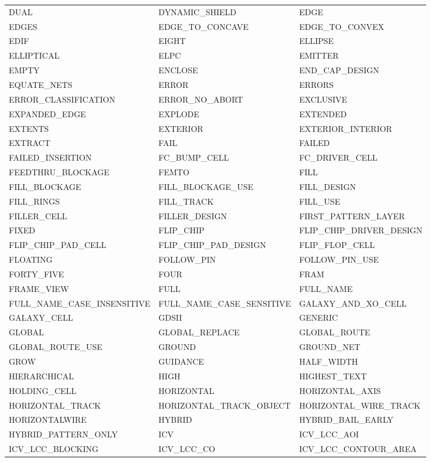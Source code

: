 \begin{longtable}{@{}>{\raggedright\arraybackslash\ttfamily}p{} >{\raggedright\arraybackslash\ttfamily}p{} >{\raggedright\arraybackslash\ttfamily}p{}@{}}
DUAL & DYNAMIC\_SHIELD & EDGE \\
EDGES & EDGE\_TO\_CONCAVE & EDGE\_TO\_CONVEX \\
EDIF & EIGHT & ELLIPSE \\
ELLIPTICAL & ELPC & EMITTER \\
EMPTY & ENCLOSE & END\_CAP\_DESIGN \\
EQUATE\_NETS & ERROR & ERRORS \\
ERROR\_CLASSIFICATION & ERROR\_NO\_ABORT & EXCLUSIVE \\
EXPANDED\_EDGE & EXPLODE & EXTENDED \\
EXTENTS & EXTERIOR & EXTERIOR\_INTERIOR \\
EXTRACT & FAIL & FAILED \\
FAILED\_INSERTION & FC\_BUMP\_CELL & FC\_DRIVER\_CELL \\
FEEDTHRU\_BLOCKAGE & FEMTO & FILL \\
FILL\_BLOCKAGE & FILL\_BLOCKAGE\_USE & FILL\_DESIGN \\
FILL\_RINGS & FILL\_TRACK & FILL\_USE \\
FILLER\_CELL & FILLER\_DESIGN & FIRST\_PATTERN\_LAYER \\
FIXED & FLIP\_CHIP & FLIP\_CHIP\_DRIVER\_DESIGN \\
FLIP\_CHIP\_PAD\_CELL & FLIP\_CHIP\_PAD\_DESIGN & FLIP\_FLOP\_CELL \\
FLOATING & FOLLOW\_PIN & FOLLOW\_PIN\_USE \\
FORTY\_FIVE & FOUR & FRAM \\
FRAME\_VIEW & FULL & FULL\_NAME \\
FULL\_NAME\_CASE\_INSENSITIVE & FULL\_NAME\_CASE\_SENSITIVE & GALAXY\_AND\_XO\_CELL \\
GALAXY\_CELL & GDSII & GENERIC \\
GLOBAL & GLOBAL\_REPLACE & GLOBAL\_ROUTE \\
GLOBAL\_ROUTE\_USE & GROUND & GROUND\_NET \\
GROW & GUIDANCE & HALF\_WIDTH \\
HIERARCHICAL & HIGH & HIGHEST\_TEXT \\
HOLDING\_CELL & HORIZONTAL & HORIZONTAL\_AXIS \\
HORIZONTAL\_TRACK & HORIZONTAL\_TRACK\_OBJECT & HORIZONTAL\_WIRE\_TRACK \\
HORIZONTALWIRE & HYBRID & HYBRID\_BAIL\_EARLY \\
HYBRID\_PATTERN\_ONLY & ICV & ICV\_LCC\_AOI \\
ICV\_LCC\_BLOCKING & ICV\_LCC\_CO & ICV\_LCC\_CONTOUR\_AREA \\

\end{longtable}

